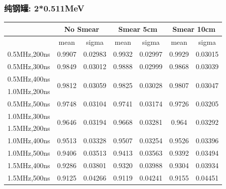 \begin{frame}
    \frametitle{纯钢罐: 2*0.511MeV}

\begin{tabular}{|c|cc|cc|cc|}
\hline
 & \multicolumn{2}{|c|}{No Smear} 
 & \multicolumn{2}{|c|}{Smear 5cm}
 & \multicolumn{2}{|c|}{Smear 10cm}
\\
\hline
 & mean & sigma
 & mean & sigma
 & mean & sigma
\\
\hline
0.5MHz,200ns
 & 0.9907 & 0.02983 
 & 0.9932 & 0.02997
 & 0.9929 & 0.03015
\\
\hline
0.5MHz,300ns
 & 0.9849 & 0.03012
 & 0.9888 & 0.02999
 & 0.9868 & 0.03039
\\
\hline
0.5MHz,400ns
& \multirow{2}{*}{0.9812} & \multirow{2}{*}{0.03059}
& \multirow{2}{*}{0.9825} & \multirow{2}{*}{0.03028}
& \multirow{2}{*}{0.9807} & \multirow{2}{*}{0.03047}
\\
\cline{1-1}
1.0MHz,200ns
 &  & 
 &  & 
 &  & 
\\
\hline
0.5MHz,500ns
 & 0.9748 & 0.03104
 & 0.9741 & 0.03174
 & 0.9726 & 0.03205
\\
\hline
1.0MHz,300ns
& \multirow{2}{*}{0.9646} & \multirow{2}{*}{0.03194}
& \multirow{2}{*}{0.9668} & \multirow{2}{*}{0.03281}
& \multirow{2}{*}{0.964} & \multirow{2}{*}{0.03292}
\\
\cline{1-1}
1.5MHz,200ns
 &  & 
 &  & 
 &  & 
\\
\hline
1.0MHz,400ns
 & 0.9513  & 0.03328
 & 0.9507  & 0.03254
 & 0.9526  & 0.03396
\\
\hline
1.0MHz,500ns
 & 0.9406 & 0.03513
 & 0.9413 & 0.03563
 & 0.9392 & 0.03494
\\
\hline
1.5MHz,400ns
 & 0.9286 & 0.03801
 & 0.9320 & 0.03988
 & 0.9304 & 0.03934
\\
\hline
1.5MHz,500ns
 & 0.9125  & 0.04266
 & 0.9119  & 0.04241
 & 0.9155  & 0.04451
\\
\hline
\end{tabular}

\end{frame}

